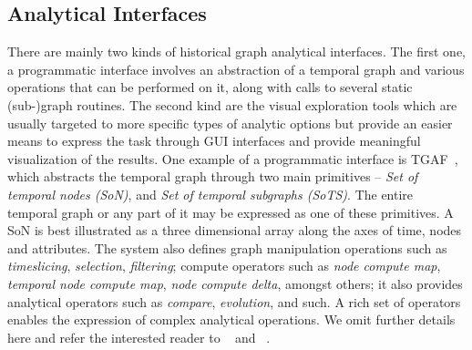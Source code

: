 \documentclass{svjour3}
\begin{document}



\subsection{Analytical Interfaces}
There are mainly two kinds of historical graph analytical interfaces. The first one, a programmatic interface involves an abstraction of a temporal graph and various operations that can be performed on it, along with calls to several static (sub-)graph routines. The second kind are the visual exploration tools which are usually targeted to more specific types of analytic options but provide an easier means to express the task through GUI interfaces and provide meaningful visualization of the results. One example of a programmatic interface is TGAF~\cite{khurana2016storing}, which abstracts the temporal graph through two main primitives --  {\em Set of temporal nodes (SoN)}, and {\em Set of temporal subgraphs (SoTS)}. The entire temporal graph or any part of it may be expressed as one of these primitives. A SoN is best illustrated as a three dimensional array along the axes of time, nodes and attributes. The system also defines graph manipulation operations such as {\em timeslicing}, {\em selection}, {\em filtering}; compute operators such as {\em node compute map}, {\em temporal node compute map}, {\em node compute delta}, amongst others; it also provides analytical operators such as {\em compare}, {\em evolution}, and such. A rich set of operators enables the expression of complex analytical operations. We omit further details here and refer the interested reader to ~\cite{khurana2016storing} and ~\cite{khurana2015historical}.
\end{document}

